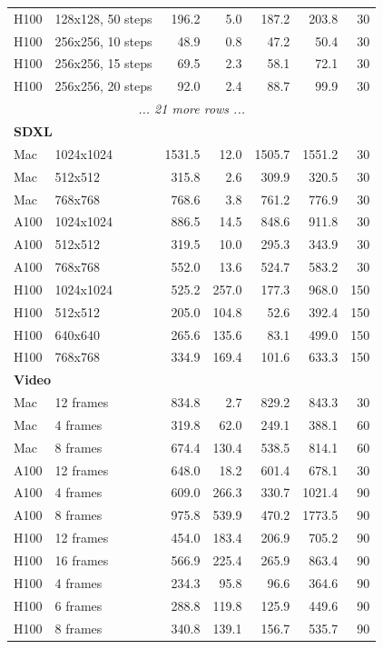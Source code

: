 \documentclass[11pt]{article}
\begin{document}
\begin{longtable}{llrrrrr}
H100 & 128x128, 50 steps & 196.2 & 5.0 & 187.2 & 203.8 & 30 \\
H100 & 256x256, 10 steps & 48.9 & 0.8 & 47.2 & 50.4 & 30 \\
H100 & 256x256, 15 steps & 69.5 & 2.3 & 58.1 & 72.1 & 30 \\
H100 & 256x256, 20 steps & 92.0 & 2.4 & 88.7 & 99.9 & 30 \\
\multicolumn{8}{c}{\textit{... 21 more rows ...}} \\
\midrule
\multicolumn{8}{l}{\textbf{SDXL}} \\
\midrule
Mac & 1024x1024 & 1531.5 & 12.0 & 1505.7 & 1551.2 & 30 \\
Mac & 512x512 & 315.8 & 2.6 & 309.9 & 320.5 & 30 \\
Mac & 768x768 & 768.6 & 3.8 & 761.2 & 776.9 & 30 \\
A100 & 1024x1024 & 886.5 & 14.5 & 848.6 & 911.8 & 30 \\
A100 & 512x512 & 319.5 & 10.0 & 295.3 & 343.9 & 30 \\
A100 & 768x768 & 552.0 & 13.6 & 524.7 & 583.2 & 30 \\
H100 & 1024x1024 & 525.2 & 257.0 & 177.3 & 968.0 & 150 \\
H100 & 512x512 & 205.0 & 104.8 & 52.6 & 392.4 & 150 \\
H100 & 640x640 & 265.6 & 135.6 & 83.1 & 499.0 & 150 \\
H100 & 768x768 & 334.9 & 169.4 & 101.6 & 633.3 & 150 \\
\midrule
\multicolumn{8}{l}{\textbf{Video}} \\
\midrule
Mac & 12 frames & 834.8 & 2.7 & 829.2 & 843.3 & 30 \\
Mac & 4 frames & 319.8 & 62.0 & 249.1 & 388.1 & 60 \\
Mac & 8 frames & 674.4 & 130.4 & 538.5 & 814.1 & 60 \\
A100 & 12 frames & 648.0 & 18.2 & 601.4 & 678.1 & 30 \\
A100 & 4 frames & 609.0 & 266.3 & 330.7 & 1021.4 & 90 \\
A100 & 8 frames & 975.8 & 539.9 & 470.2 & 1773.5 & 90 \\
H100 & 12 frames & 454.0 & 183.4 & 206.9 & 705.2 & 90 \\
H100 & 16 frames & 566.9 & 225.4 & 265.9 & 863.4 & 90 \\
H100 & 4 frames & 234.3 & 95.8 & 96.6 & 364.6 & 90 \\
H100 & 6 frames & 288.8 & 119.8 & 125.9 & 449.6 & 90 \\
H100 & 8 frames & 340.8 & 139.1 & 156.7 & 535.7 & 90 \\

\end{longtable}
\end{document}
